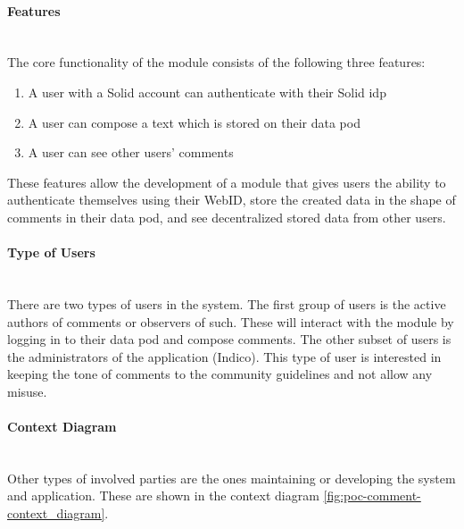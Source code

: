 \paragraph{Features}\mbox{}\\

The core functionality of the module consists of the following three features: 
\vspace{-3mm}
\begin{enumerate}
    \item A user with a Solid account can authenticate with their Solid \gls{idp}
    \item A user can compose a text which is stored on their data pod
    \item A user can see other users’ comments
\end{enumerate}
\vspace{-3mm}

These features allow the development of a module that gives users the ability to authenticate themselves using their WebID, store the created data in the shape of comments in their data pod, and see decentralized stored data from other users.
\vspace{0.5cm}
\paragraph{Type of Users}\mbox{}\\

There are two types of users in the system. The first group of users is the active authors of comments or observers of such. These will interact with the module by logging in to their data pod and compose comments. The other subset of users is the administrators of the application (Indico). This type of user is interested in keeping the tone of comments to the community guidelines and not allow any misuse.
\vspace{0.5cm}
\paragraph{Context Diagram}\mbox{}\\

Other types of involved parties are the ones maintaining or developing the system and application. These are shown in the context diagram \ref{fig:poc-comment-context_diagram}.

